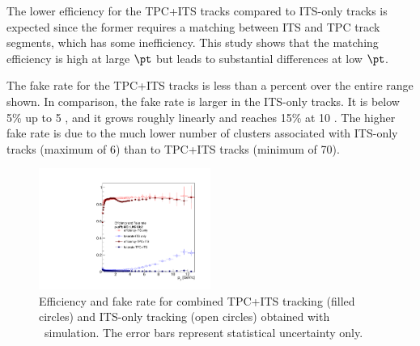 The lower efficiency for the TPC+ITS tracks compared to ITS-only tracks is expected since the former requires a matching between ITS and TPC track segments, which has some inefficiency. This study shows that the matching efficiency is high at large $\pt$ but leads to substantial differences at low $\pt$.  


The fake rate for the TPC+ITS tracks is less than a percent over the entire range shown. In comparison, the fake rate is larger in the ITS-only tracks. It is below 5\% up to 5 \GeVc, and it grows roughly linearly and reaches 15\%  at 10 \GeVc. The higher fake rate is due to the much lower number of clusters associated with ITS-only tracks (maximum of 6) than to TPC+ITS tracks (minimum of 70).
\begin{figure}[h]
\center
\includegraphics[width=0.5\textwidth]{Data_Analysis/Tracking/HybridAndITS_Eff_fakerate_pPb_lowpt.pdf}
\caption{Efficiency and fake rate for combined TPC+ITS tracking (filled circles) and ITS-only tracking (open circles) obtained with \pPb~simulation. The error bars represent statistical uncertainty only.}
\label{fig:tpcEff}
\end{figure}



